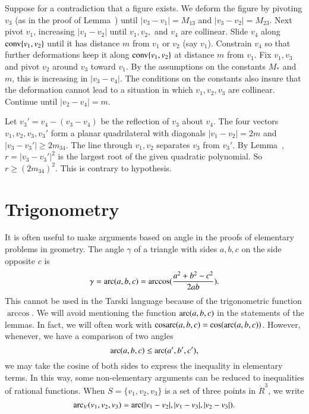 \begin{tarskidata}
\begin{tarski}

\begin{proved}  Suppose for a contradiction that a figure exists.
We deform the figure by pivoting $v_3$ 
(as in the proof of Lemma~)
until $|v_3-v_1| = M_{13}$ and $|v_3-v_2|=M_{23}$.   Next pivot $v_1$, increasing $|v_1-v_2|$
until $v_1,v_2,$ and $v_4$ are collinear.  Slide $v_4$ along ${\operatorname{conv}}\{v_1,v_2\}$ until
it has distance $m$ from $v_1$ or $v_2$ (say $v_1$).   Constrain $v_4$ so that further
deformations keep it along  ${\operatorname{conv}}\{v_1,v_2\}$ at distance $m$ from $v_1$.  
Fix $v_1,v_3$ and pivot $v_2$ around $v_3$ toward $v_1$.
By the assumptions on the constants $M_*$ and $m$, this is increasing in $|v_3-v_4|$.  The conditions
on the constants also insure that the deformation cannot lead to a situation in which
$v_1,v_2,v_3$ are collinear.  Continue
until $|v_2-v_4|=m$.

Let $v_3' = v_4 - (v_3-v_4)$ be the reflection of $v_3$ about $v_4$.  The four vectors
$v_1,v_2,v_3,v_3'$ form a planar quadrilateral with diagonals $|v_1-v_2|=2m$ and $|v_3-v_3'| \ge 2m_{34}$.
The line through $v_1,v_2$ separates $v_3$ from $v_3'$.  By Lemma~,  
$r = |v_3-v_3'|^2$ is
the largest root of the given quadratic polynomial.  So $r \ge (2 m_{34})^2$.  This is contrary
to hypothesis.
\swallowed\end{proved}
\end{tarski}






\section{Trigonometry}


It is often useful to make arguments based on angle in the proofs
of elementary problems in geometry. The angle $\gamma$
of a triangle with sides
$a,b,c$ on the side opposite $c$ is
    $$
    \gamma = \operatorname{arc}(a,b,c)=\arccos(\frac{a^2 + b^2 - c^2}{2 a b}).
    $$
This cannot be used in the Tarski language because of the trigonometric
function $\arccos$.  We will avoid mentioning the function
$\operatorname{arc}(a,b,c)$ in the statements of the lemmas.
In fact, we will often work with $\operatorname{cosarc}(a,b,c) = \cos(\operatorname{arc}(a,b,c))$.
However, whenever, we have a comparison of
two angles
    $$
    \operatorname{arc}(a,b,c) \le \operatorname{arc}(a',b',c'),
    $$
we may take the cosine of both sides to express the inequality in
elementary terms.  In this way, some non-elementary arguments
can be reduced to inequalities of rational functions.  When
$S=\{v_1,v_2,v_3\}$ is a set of three points in $\ring{R}^3$, we write
   $$
   \operatorname{arc}_V(v_1,v_2,v_3) = \operatorname{arc}(|v_1-v_2|,|v_1-v_3|,|v_2-v_3|).
   $$


\end{tarskidata}

